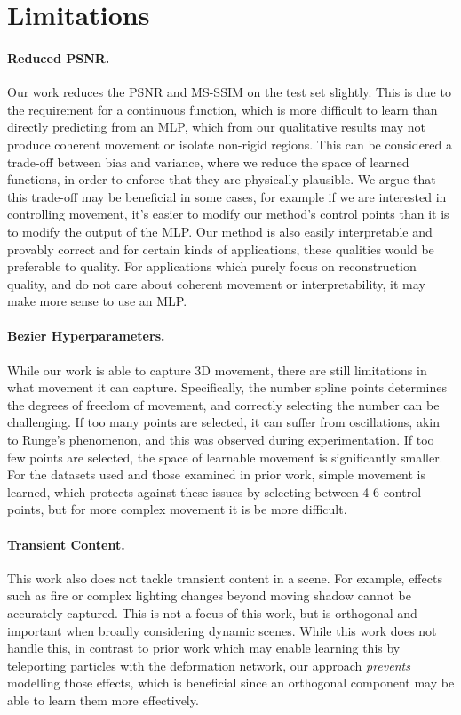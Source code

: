 \section*{Limitations}

\paragraph{Reduced PSNR.} Our work reduces the PSNR and MS-SSIM on the test set slightly. This is due to the requirement for a continuous function, which is more difficult to learn than directly predicting from an MLP, which from our qualitative results may not produce coherent movement or isolate non-rigid regions. This can be considered a trade-off between bias and variance, where we reduce the space of learned functions, in order to enforce that they are physically plausible. We argue that this trade-off may be beneficial in some cases, for example if we are interested in controlling movement, it's easier to modify our method's control points than it is to modify the output of the MLP. Our method is also easily interpretable and provably correct and for certain kinds of applications, these qualities would be preferable to quality. For applications which purely focus on reconstruction quality, and do not care about coherent movement or interpretability, it may make more sense to use an MLP.

\paragraph{Bezier Hyperparameters.} While our work is able to capture 3D movement, there are still limitations in what movement it can capture. Specifically, the number spline points determines the degrees of freedom of movement, and correctly selecting the number can be challenging. If too many points are selected, it can suffer from oscillations, akin to Runge's phenomenon, and this was observed during experimentation. If too few points are selected, the space of learnable movement is significantly smaller. For the datasets used and those examined in prior work, simple movement is learned, which protects against these issues by selecting between 4-6 control points, but for more complex movement it is be more difficult.

\paragraph{Transient Content.} This work also does not tackle transient content in a scene. For example, effects such as fire or complex lighting changes beyond moving shadow cannot be accurately captured. This is not a focus of this work, but is orthogonal and important when broadly considering dynamic scenes. While this work does not handle this, in contrast to prior work which may enable learning this by teleporting particles with the deformation network, our approach \textit{prevents} modelling those effects, which is beneficial since an orthogonal component may be able to learn them more effectively.

